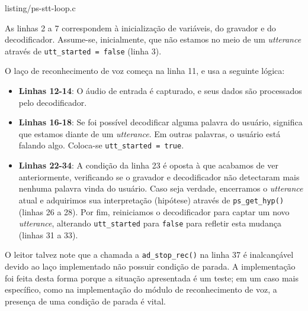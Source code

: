 \begin{minipage}{\linewidth}

  {listing/ps-stt-loop.c}
\end{minipage}

As linhas 2 a 7 correspondem à inicialização de variáveis, do gravador e do decodificador. Assume-se, inicialmente, que não estamos no meio de um \textit{utterance} através de \mbox{\texttt{utt\_started = false}} (linha 3).

O laço de reconhecimento de voz começa na linha 11, e usa a seguinte lógica:

\begin{itemize}
\item \textbf{Linhas 12-14}: O áudio de entrada é capturado, e seus dados são processados pelo decodificador.

\item \textbf{Linhas 16-18}: Se foi possível decodificar alguma palavra do usuário, significa que estamos diante de um \textit{utterance}. Em outras palavras, o usuário está falando algo. Coloca-se \texttt{utt\_started = true}.

\item \textbf{Linhas 22-34}: A condição da linha 23 é oposta à que acabamos de ver anteriormente, verificando se o gravador e decodificador não detectaram mais nenhuma palavra vinda do usuário. Caso seja verdade, encerramos o \textit{utterance} atual e adquirimos sua interpretação (hipótese) através de \texttt{ps\_get\_hyp()} (linhas 26 a 28). Por fim, reiniciamos o decodificador para captar um novo \textit{utterance}, alterando \texttt{utt\_started} para \texttt{false} para refletir esta mudança (linhas 31 a 33).
\end{itemize}

O leitor talvez note que a chamada a \texttt{ad\_stop\_rec()} na linha 37 é inalcançável devido ao laço implementado não possuir condição de parada. A implementação foi feita desta forma porque a situação apresentada é um teste; em um caso mais específico, como na implementação do módulo de reconhecimento de voz, a presença de uma condição de parada é vital.
